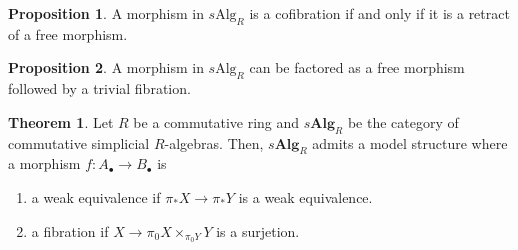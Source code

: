 \documentclass{article}
\theoremstyle{definition}
\newtheorem{theorem}{Theorem}[section]
\theoremstyle{definition}
\theoremstyle{definition}
\theoremstyle{definition}
\newtheorem{proposition}{Proposition}[theorem]
\theoremstyle{definition}
\theoremstyle{definition}
\theoremstyle{definition}
\begin{document}
\begin{proposition}
A morphism in $s \textrm{Alg}_R$ is a cofibration if and only if it is a retract of a free morphism.
\end{proposition}

\begin{proposition}
	A morphism in $s \textrm{Alg}_R$ can be factored as a free morphism followed by a trivial fibration.
\end{proposition}



\begin{theorem}
	Let $R$ be a commutative ring and $s \textbf{Alg}_R$ be the category of commutative simplicial $R$-algebras. Then, $s \textbf{Alg}_R$ admits a model structure where a morphism $f: A_{\bullet}\to B_{\bullet}$ is 
	\begin{enumerate}
		\item a weak equivalence if $\pi_*X\to \pi_*Y$ is a weak equivalence. 
		\item a fibration if $X\to \pi_0X\times_{\pi_0Y} Y$ is a surjetion.
	\end{enumerate}
\end{theorem}









\newpage


\end{document}
